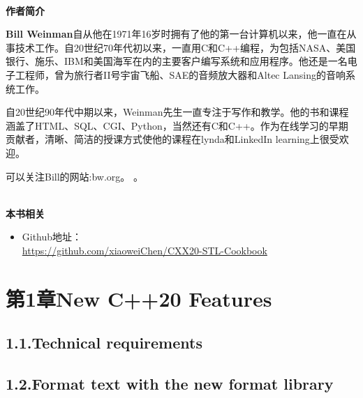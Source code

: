 \documentclass[11pt,a4paper,UTF8]{book}
\begin{document}
\begin{sloppypar}
	\hspace*{\fill} \\ %
	\noindent\textbf{作者简介}
	
	\textbf{Bill Weinman}自从他在1971年16岁时拥有了他的第一台计算机以来，他一直在从事技术工作。自20世纪70年代初以来，一直用C和C++编程，为包括NASA、美国银行、施乐、IBM和美国海军在内的主要客户编写系统和应用程序。他还是一名电子工程师，曾为旅行者II号宇宙飞船、SAE的音频放大器和Altec Lansing的音响系统工作。
	
	自20世纪90年代中期以来，Weinman先生一直专注于写作和教学。他的书和课程涵盖了HTML、SQL、CGI、Python，当然还有C和C++。作为在线学习的早期贡献者，清晰、简洁的授课方式使他的课程在lynda和LinkedIn learning上很受欢迎。
	
	可以关注Bill的网站:bw.org。
	。
	
	\hspace*{\fill} \\ %
	\noindent\textbf{本书相关}
	\begin{itemize}
		\item Github地址：\\\url{https://github.com/xiaoweiChen/CXX20-STL-Cookbook}
	\end{itemize}
	\newpage
	
	\pagestyle{empty}
	
	\newpage
	
	\tableofcontents
	\newpage


	\section*{ 第1章\hspace{0.5cm}New C++20 Features}
	
	
	\subsection*{ 1.1.\hspace{0.2cm}Technical requirements}
	
	
	\subsection*{ 1.2.\hspace{0.2cm}Format text with the new format library}
	
	

\end{sloppypar}
\end{document}
